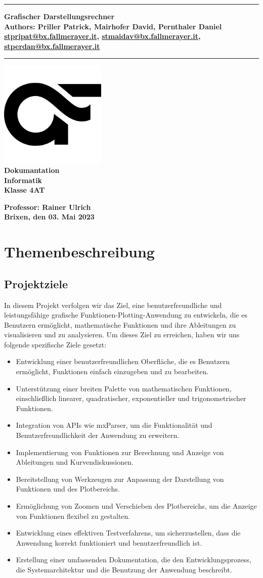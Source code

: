 \documentclass[a4paper]{article}
\newcommand{\CustomTitle}[9]{
    \thispagestyle{empty}
    \vspace*{\stretch{1}}
    {\parindent0cm \rule{\linewidth}{.7ex}}
    \begin{flushright}
        \vspace*{\stretch{1}}
        \sffamily\bfseries\huge
        #1\\
        \vspace*{\stretch{1}}
        \sffamily\bfseries\small
        #2\\
        \vspace*{\stretch{1}}
        \sffamily\bfseries\small
        #3
    \end{flushright}
    \rule{\linewidth}{.7ex}

    \vspace*{\stretch{1}}
    \begin{center}
        \includegraphics[width=2in]{Resources/logo.png} \\
        \vspace*{\stretch{1}}
        \textbf{\Large Dokumantation}\\

        \vspace*{\stretch{2}}
        \textbf{\large Informatik}\\
        \textbf{\large Klasse 4AT}

        \vspace*{\stretch{1}}
        \textbf{\large Professor: Rainer Ulrich}  \\[1mm]

        \vspace*{\stretch{1}}
        \textbf{\large Brixen, den 03. Mai 2023}\\
        \vspace*{\stretch{0.25}}
    \end{center}
}
\begin{document}
\CustomTitle
{Grafischer Darstellungsrechner}
{Authors: Priller Patrick, Mairhofer David, Pernthaler Daniel}
{\href{mailto:stpripat@bx.fallmerayer.it}{stpripat@bx.fallmerayer.it}, \href{mailto:stmaidav@bx.fallmerayer.it}{stmaidav@bx.fallmerayer.it}, \href{mailto:stperdan@bx.fallmayer.it}{stperdan@bx.fallmerayer.it}}

{Oberschulzentrum J. Ph. Fallmerayer}
{Brixen}
{\today}
{Rainer Ulrich}
{}

\clearpage

\lhead{}
\setcounter{page}{1}
\tableofcontents

\clearpage

\section{Themenbeschreibung}

\subsection{Projektziele}

In diesem Projekt verfolgen wir das Ziel, eine benutzerfreundliche und leistungsfähige grafische Funktionen-Plotting-Anwendung zu entwickeln, die es Benutzern ermöglicht, mathematische Funktionen und ihre Ableitungen zu visualisieren und zu analysieren. Um dieses Ziel zu erreichen, haben wir uns folgende spezifische Ziele gesetzt:

\begin{itemize}
	\item Entwicklung einer benutzerfreundlichen Oberfläche, die es Benutzern ermöglicht, Funktionen einfach einzugeben und zu bearbeiten.
	\item Unterstützung einer breiten Palette von mathematischen Funktionen, einschließlich linearer, quadratischer, exponentieller und trigonometrischer Funktionen.
	\item Integration von APIs wie mxParser, um die Funktionalität und Benutzerfreundlichkeit der Anwendung zu erweitern.
	\item Implementierung von Funktionen zur Berechnung und Anzeige von Ableitungen und Kurvendiskussionen.
	\item Bereitstellung von Werkzeugen zur Anpassung der Darstellung von Funktionen und des Plotbereichs.
	\item Ermöglichung von Zoomen und Verschieben des Plotbereichs, um die Anzeige von Funktionen flexibel zu gestalten.
	\item Entwicklung eines effektiven Testverfahrens, um sicherzustellen, dass die Anwendung korrekt funktioniert und benutzerfreundlich ist.
	\item Erstellung einer umfassenden Dokumentation, die den Entwicklungsprozess, die Systemarchitektur und die Benutzung der Anwendung beschreibt.
\end{itemize}
\end{document}

